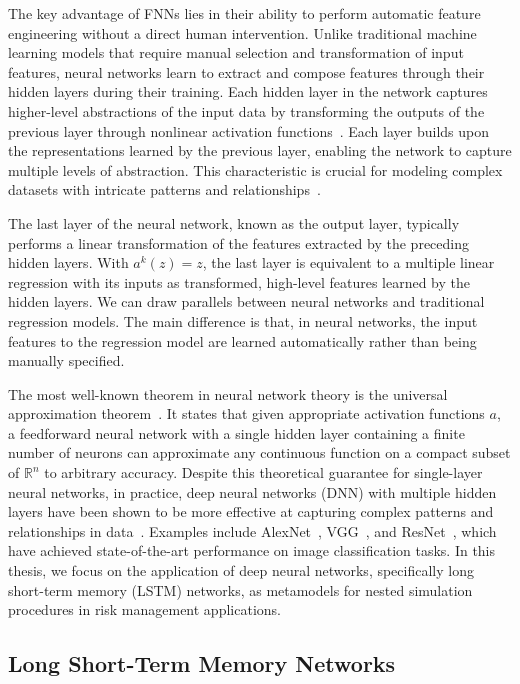 The key advantage of FNNs lies in their ability to perform automatic feature engineering without a direct human intervention. 
Unlike traditional machine learning models that require manual selection and transformation of input features, neural networks learn to extract and compose features through their hidden layers during their training. 
Each hidden layer in the network captures higher-level abstractions of the input data by transforming the outputs of the previous layer through nonlinear activation functions~\citep{lecun2015deep}.
Each layer builds upon the representations learned by the previous layer, enabling the network to capture multiple levels of abstraction. 
This characteristic is crucial for modeling complex datasets with intricate patterns and relationships~\citep{bengio2013representation}.

The last layer of the neural network, known as the output layer, typically performs a linear transformation of the features extracted by the preceding hidden layers. 
With $a^{k}(z) = z$, the last layer is equivalent to a multiple linear regression with its inputs as transformed, high-level features learned by the hidden layers.
We can draw parallels between neural networks and traditional regression models. 
The main difference is that, in neural networks, the input features to the regression model are learned automatically rather than being manually specified.

The most well-known theorem in neural network theory is the universal approximation theorem~\citep{hornik1989multilayer}.
It states that given appropriate activation functions $a$, a feedforward neural network with a single hidden layer containing a finite number of neurons can approximate any continuous function on a compact subset of $\mathbb{R}^n$ to arbitrary accuracy. 
Despite this theoretical guarantee for single-layer neural networks, in practice, deep neural networks (DNN) with multiple hidden layers have been shown to be more effective at capturing complex patterns and relationships in data~\citep{lecun2015deep}.
Examples include AlexNet~\citep{krizhevsky2012imagenet}, VGG~\citep{simonyan2014very}, and ResNet~\citep{he2016deep}, which have achieved state-of-the-art performance on image classification tasks.
In this thesis, we focus on the application of deep neural networks, specifically long short-term memory (LSTM) networks, as metamodels for nested simulation procedures in risk management applications.

\subsection{Long Short-Term Memory Networks} \label{subsec:LSTM}

